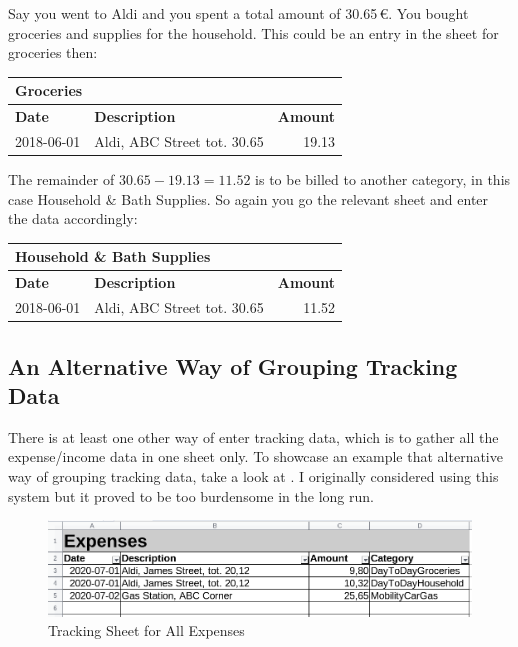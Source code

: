 Say you went to Aldi and you spent a total amount of 30.65\,€.
You bought groceries and supplies for the household.
This could be an entry in the sheet for groceries then:
\begin{center}\sffamily
	\begin{tabular}{|l|l|r|}
		\multicolumn{3}{l}{Groceries}\\
		\hline
		\textbf{Date} & \textbf{Description} & \textbf{Amount}\rmfamily\\
		\hline
		2018-06-01 & Aldi, ABC Street tot. 30.65 & 19.13\\
		\hline
	\end{tabular}
\end{center}

The remainder of \( 30.65 - 19.13 = 11.52\) is to be billed to another category, in this case Household \& Bath Supplies.
So again you go the relevant sheet and enter the data accordingly:
\begin{center}\sffamily
	\begin{tabular}{|l|l|r|}
		\multicolumn{3}{l}{Household \& Bath Supplies}\\			
		\hline
		\textbf{Date} & \textbf{Description} & \textbf{Amount}\\
		\hline
		2018-06-01 & Aldi, ABC Street tot. 30.65 & 11.52\\
		\hline
	\end{tabular}
\end{center}

\subsection{An Alternative Way of Grouping Tracking Data}
\label{subsec:alternative-way-of-grouping-tracking-data}

There is at least one other way of enter tracking data, which is to gather all the expense/income data in one sheet only.
To showcase an example that alternative way of grouping tracking data, take a look at .
I originally considered using this system but it proved to be too burdensome in the long run.
\begin{figure}[htp]
	\centering
	\includegraphics[width=0.8\linewidth]{Gfx/EXP-all-in-one-sheet}
	\caption{Tracking Sheet for All Expenses}
	\label{fig:expenses-data-entry-in-one-sheet-only}
\end{figure}

